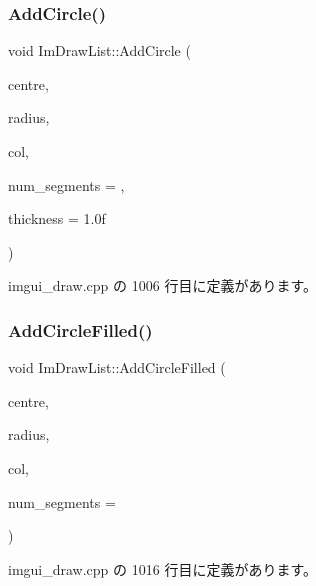 \subsubsection{\texorpdfstring{Add\+Circle()}{AddCircle()}}
{\footnotesize\ttfamily void Im\+Draw\+List\+::\+Add\+Circle (\begin{DoxyParamCaption}\item[{const \mbox{\hyperlink{struct_im_vec2}{Im\+Vec2}} \&}]{centre,  }\item[{float}]{radius,  }\item[{\mbox{\hyperlink{imgui_8h_a118cff4eeb8d00e7d07ce3d6460eed36}{Im\+U32}}}]{col,  }\item[{int}]{num\+\_\+segments = {},  }\item[{float}]{thickness = {\ttfamily 1.0f} }\end{DoxyParamCaption})}



 imgui\+\_\+draw.\+cpp の 1006 行目に定義があります。

\mbox{\label{struct_im_draw_list_a293e87d22e17587e3994cf6deb20be45}} 
\subsubsection{\texorpdfstring{Add\+Circle\+Filled()}{AddCircleFilled()}}
{\footnotesize\ttfamily void Im\+Draw\+List\+::\+Add\+Circle\+Filled (\begin{DoxyParamCaption}\item[{const \mbox{\hyperlink{struct_im_vec2}{Im\+Vec2}} \&}]{centre,  }\item[{float}]{radius,  }\item[{\mbox{\hyperlink{imgui_8h_a118cff4eeb8d00e7d07ce3d6460eed36}{Im\+U32}}}]{col,  }\item[{int}]{num\+\_\+segments = {} }\end{DoxyParamCaption})}



 imgui\+\_\+draw.\+cpp の 1016 行目に定義があります。

\mbox{\label{struct_im_draw_list_a3ba618d0615e410dce9eaa0b80a30126}} 
